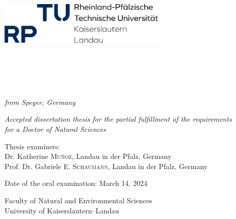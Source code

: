 \begin{titlepage}
\begin{center}

\includegraphics[width=0.6\textwidth]{figures/logo_rptu.png}

\vspace{1cm}

{\onehalfspacing
\HRule \\[0.2cm]
{\huge \bfseries \ttitle\par}\vspace{0.2cm}
\HRule \\[0.2cm]
}

\vspace{1cm}

{\Large \href{https://orcid.org/0000-0001-5468-6069}{\authorname} \\
\textit{from Speyer, Germany}}

\vspace{1.2cm}

{\textsf{\large \textit{Accepted dissertation thesis for the partial fulfillment of the requirements \\
for a Doctor of Natural Sciences }}}

\vspace{1.6cm}

\vfill

{\textsf{\large Thesis examiners: \\
Dr. Katherine \textsc{Muñoz}, Landau in der Pfalz, Germany \\
Prof. Dr. Gabriele E. \textsc{Schaumann}, Landau in der Pfalz, Germany
}}

\vspace{-0.2 cm}

\vfill

{\textsf{\large Date of the oral examination: March 14, 2024}}

\vspace{1.6cm}

\vfill

{\textsf{\Large Faculty of Natural and Environmental Sciences \\
University of Kaiserslautern--Landau}}

\vfill

\end{center}
\end{titlepage}

